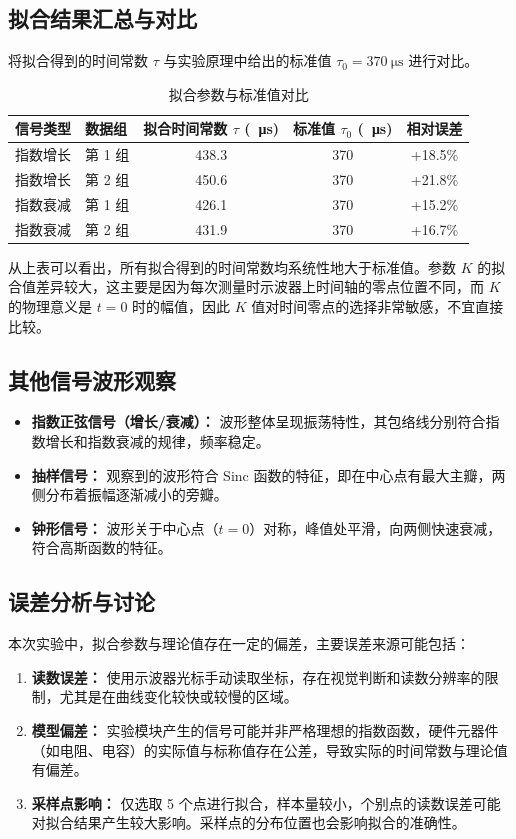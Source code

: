 \documentclass{ctexart}
\begin{document}
\subsection{拟合结果汇总与对比}
将拟合得到的时间常数 $\tau$ 与实验原理中给出的标准值 $\tau_0 = \SI{370}{\micro\second}$ 进行对比。
\begin{table}[htbp]
    \centering
    \caption{拟合参数与标准值对比}
    \label{tab:comparison}
    \begin{tabular}{llccc}
        \toprule
        \textbf{信号类型} & \textbf{数据组} & \textbf{拟合时间常数 $\tau$ (\SI{}{\micro\second})} & \textbf{标准值 $\tau_0$ (\SI{}{\micro\second})} & \textbf{相对误差} \\
        \midrule
        指数增长 & 第 1 组 & 438.3 & 370 & +18.5\% \\
        指数增长 & 第 2 组 & 450.6 & 370 & +21.8\% \\
        \midrule
        指数衰减 & 第 1 组 & 426.1 & 370 & +15.2\% \\
        指数衰减 & 第 2 组 & 431.9 & 370 & +16.7\% \\
        \bottomrule
    \end{tabular}
\end{table}
从上表可以看出，所有拟合得到的时间常数均系统性地大于标准值。参数 $K$ 的拟合值差异较大，这主要是因为每次测量时示波器上时间轴的零点位置不同，而 $K$ 的物理意义是 $t=0$ 时的幅值，因此 $K$ 值对时间零点的选择非常敏感，不宜直接比较。

\subsection{其他信号波形观察}
\begin{itemize}
    \item \textbf{指数正弦信号（增长/衰减）：} 波形整体呈现振荡特性，其包络线分别符合指数增长和指数衰减的规律，频率稳定。
    \item \textbf{抽样信号：} 观察到的波形符合 Sinc 函数的特征，即在中心点有最大主瓣，两侧分布着振幅逐渐减小的旁瓣。
    \item \textbf{钟形信号：} 波形关于中心点（$t=0$）对称，峰值处平滑，向两侧快速衰减，符合高斯函数的特征。
\end{itemize}

\subsection{误差分析与讨论}
本次实验中，拟合参数与理论值存在一定的偏差，主要误差来源可能包括：
\begin{enumerate}
    \item \textbf{读数误差：} 使用示波器光标手动读取坐标，存在视觉判断和读数分辨率的限制，尤其是在曲线变化较快或较慢的区域。
    \item \textbf{模型偏差：} 实验模块产生的信号可能并非严格理想的指数函数，硬件元器件（如电阻、电容）的实际值与标称值存在公差，导致实际的时间常数与理论值有偏差。
    \item \textbf{采样点影响：} 仅选取 5 个点进行拟合，样本量较小，个别点的读数误差可能对拟合结果产生较大影响。采样点的分布位置也会影响拟合的准确性。
\end{enumerate}
\end{document}
